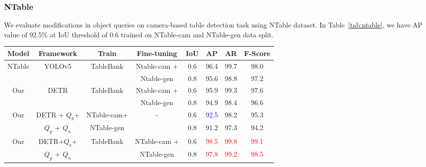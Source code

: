 \documentclass[sn-mathphys]{sn-jnl}\jyear{2021}\theoremstyle{thmstyleone}\newtheorem{theorem}{Theorem}\newtheorem{proposition}[theorem]{Proposition}\theoremstyle{thmstyletwo}\newtheorem{example}{Example}\newtheorem{remark}{Remark}\theoremstyle{thmstylethree}\newtheorem{definition}{Definition}\usepackage{amsmath}
\begin{document}
\subsubsection{NTable}
\label{sec:NTables-result}
We evaluate modifications in object queries on camera-based table detection task using NTable dataset. In Table~\ref{tab:ntable}, we have AP value of 92.5$\%$ at IoU threshold of 0.6 trained on NTable-cam and NTable-gen data split. 
\begin{table*}[htp!]
\tiny
\begin{center}
\caption{Comparison between the transformer-based detectors and previous state-of-the-art results on NTable dataset \colorbox{red!25}{without pre-processing} (raw data). Here, term $Q_b$ represents object queries as anchor boxes, $Q_p$ denotes object queries with positive noise and $Q_n$ indicates object queries with negative noise. The best results are exhibited.}\label{tab:ntable}\begin{tabular*}{\textwidth}
{@{\extracolsep{\fill}}cccccccc@{\extracolsep{\fill}}}
\toprule
\textbf{Model} &
\textbf{Framework} &
\textbf{Train} &
\textbf{Fine-tuning} &
\textbf{IoU} &
\textbf{AP} &
\textbf{AR} &
\textbf{F-Score} \\
\midrule

\multirow{2}{*}{NTable \cite{NTables}} & \multirow{2}{*}{YOLOv5} & \multirow{2}{*}{TableBank} & Ntable-cam +  & 0.6 & 96.4 & 99.7 & 98.0 \\
&  &  & Ntable-gen & 0.8 & 95.6 & 98.8 & 97.2\\
\midrule

\multirow{2}{*}{Our} & \multirow{2}{*}{DETR} & \multirow{2}{*}{TableBank} & Ntable-cam +  & 0.6 & 95.9 & 99.3 & 97.6 \\
&  &  & Ntable-gen & 0.8 & 94.9 & 98.4 & 96.6\\
\midrule

\multirow{2}{*}{Our} & DETR + $Q_b$+  & NTable-cam+  & \multirow{2}{*}{-} & 0.6 & \textcolor{blue}{92.5} & 98.2 & 95.3 \\
& $Q_p$ + $Q_n$ & NTable-gen & & 0.8 & 91.2 & 97.3 & 94.2 \\
\midrule

\multirow{2}{*}{Our} & DETR+$Q_b$+ & \multirow{2}{*}{TableBank} & NTable-cam +  & 0.6 & \textcolor{red}{98.5} & \textcolor{red}{99.8} & \textcolor{red}{99.1} \\
& $Q_p$ + $Q_n$ &  & NTable-gen & 0.8 & \textcolor{red}{97.8} & \textcolor{red}{99.2} & \textcolor{red}{98.5} \\

\bottomrule
\end{tabular*}
\end{center}
\end{table*}
\end{document}
